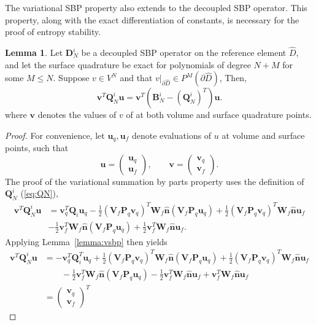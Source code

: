 \documentclass[preprint,10pt]{elsarticle}
\theoremstyle{definition}
\theoremstyle{lemma}
\newtheorem{lemma}{Lemma}
\theoremstyle{corollary}
\theoremstyle{theorem}
\theoremstyle{assumption}
\renewcommand{\hat}[1]{\widehat{#1}}
\newcommand{\LRp}[1]{\left( #1 \right)}
\newcommand{\LRl}[1]{\left. #1 \right|}
\begin{document}
The variational SBP property also extends to the decoupled SBP operator.  This property, along with the exact differentiation of constants, is necessary for the proof of entropy stability.  
\begin{lemma}
Let $\bm{D}^i_N$ be a decoupled SBP operator on the reference element $\hat{D}$, and let the surface quadrature be exact for polynomials of degree $N+M$ for some $M \leq N$.  Suppose $v\in V^N$ and that $\LRl{v}_{\partial \hat{D}} \in P^M\LRp{\partial \hat{D}}$, Then, 
\[
\bm{v}^T\bm{Q}^i_N\bm{u} = \bm{v}^T\LRp{\bm{B}^i_N - \LRp{\bm{Q}^i_N}^T}\bm{u}.%
\]
where $\bm{v}$ denotes the values of $v$ of at both volume and surface quadrature points.  
\label{lemma:vdsbp}
\end{lemma}
\begin{proof}
For convenience, let $\bm{u}_q, \bm{u}_f$ denote evaluations of $u$ at volume and surface points, such that 
\[
\bm{u} = \begin{pmatrix} \bm{u}_q\\ \bm{u}_f\end{pmatrix}, \qquad \bm{v} = \begin{pmatrix} \bm{v}_q\\ \bm{v}_f\end{pmatrix}.  
\]
The proof of the variational summation by parts property uses the definition of $\bm{Q}^i_N$ (\ref{eq:QN}), 
\begin{align*}
\bm{v}^T\bm{Q}^i_N\bm{u} &= \bm{v}_q^T\bm{Q}_i \bm{u}_q - \frac{1}{2}\LRp{\bm{V}_f\bm{P}_q\bm{v}_q}^T\bm{W}_f\hat{\bm{n}} \LRp{\bm{V}_f\bm{P}_q\bm{u}_q} + \frac{1}{2}\LRp{\bm{V}_f\bm{P}_q\bm{v}_q}^T\bm{W}_f\hat{\bm{n}} \bm{u}_f\\
& - \frac{1}{2}\bm{v}_f^T\bm{W}_f\hat{\bm{n}} \LRp{\bm{V}_f\bm{P}_q\bm{u}_q} + \frac{1}{2}\bm{v}_f^T\bm{W}_f\hat{\bm{n}} \bm{u}_f.
\end{align*}
Applying Lemma~\ref{lemma:vsbp} then yields
\begin{align*}
\bm{v}^T\bm{Q}^i_N\bm{u} &= -\bm{v}_q^T\bm{Q}^T_i \bm{u}_q + \frac{1}{2}\LRp{\bm{V}_f\bm{P}_q\bm{v}_q}^T\bm{W}_f\hat{\bm{n}} \LRp{\bm{V}_f\bm{P}_q\bm{u}_q} + \frac{1}{2}\LRp{\bm{V}_f\bm{P}_q\bm{v}_q}^T\bm{W}_f\hat{\bm{n}} \bm{u}_f\\
&\qquad - \frac{1}{2}\bm{v}_f^T\bm{W}_f\hat{\bm{n}} \LRp{\bm{V}_f\bm{P}_q\bm{u}_q} - \frac{1}{2}\bm{v}_f^T\bm{W}_f\hat{\bm{n}} \bm{u}_f + \bm{v}_f^T\bm{W}_f\hat{\bm{n}} \bm{u}_f\\
&= \begin{pmatrix} \bm{v}_q\\ \bm{v}_f\end{pmatrix}^T 

\end{align*}
\end{proof}
\end{document}
